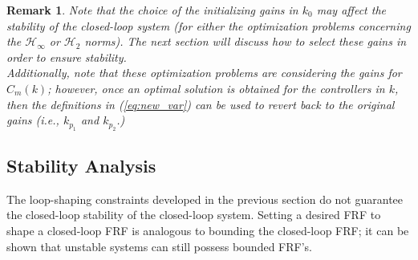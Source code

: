 \documentclass[a4paper, 10pt, conference]{ieeeconf}
\newtheorem*{remark}{Remark}
\begin{document}

\begin{remark}
\textit{Note that the choice of the initializing gains in $k_0$ may affect the stability of the closed-loop system (for either the optimization problems concerning the $\mathcal{H}_\infty$ or $\mathcal{H}_2$ norms). The next section will discuss how to select these gains in order to ensure stability. \\ 
Additionally, note that these optimization problems are considering the gains for $C_m(k)$; however, once an optimal solution is obtained for the controllers in $k$, then the definitions in (\ref{eq:new_var}) can be used to revert back to the original gains (i.e., $k_{p_1}$ and $k_{p_2}$.)}
\end{remark}

\subsection{Stability Analysis}
The loop-shaping constraints developed in the previous section do not guarantee the closed-loop stability of the closed-loop system. Setting a desired FRF to shape a closed-loop FRF is analogous to bounding the closed-loop FRF; it can be shown that unstable systems can still possess bounded FRF's. 
\end{document}
